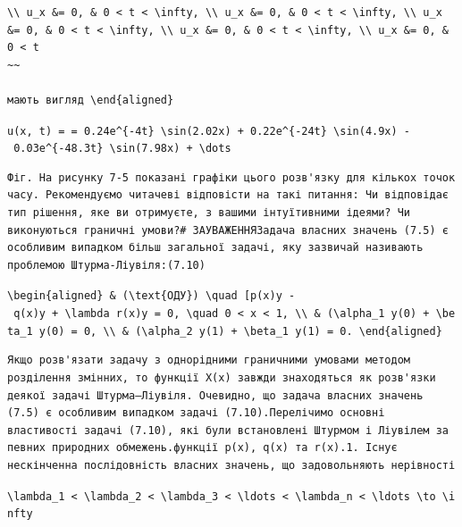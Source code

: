 \documentclass[
  ukrainian,
]{article}
\begin{document}
\begin{verbatim}
\\ u_x &= 0, & 0 < t < \infty, \\ u_x &= 0, & 0 < t < \infty, \\ u_x &= 0, & 0 < t < \infty, \\ u_x &= 0, & 0 < t < \infty, \\ u_x &= 0, & 0 < t
~~

мають вигляд \end{aligned}
\end{verbatim}

\texttt{u(x,\ t)\ =\ =\ 0.24e\^{}\{-4t\}\ \textbackslash{}sin(2.02x)\ +\ 0.22e\^{}\{-24t\}\ \textbackslash{}sin(4.9x)\ -\ 0.03e\^{}\{-48.3t\}\ \textbackslash{}sin(7.98x)\ +\ \textbackslash{}dots}

\begin{verbatim}
Фіг. На рисунку 7-5 показані графіки цього розв'язку для кількох точок часу. Рекомендуємо читачеві відповісти на такі питання: Чи відповідає тип рішення, яке ви отримуєте, з вашими інтуїтивними ідеями? Чи виконуються граничні умови?# ЗАУВАЖЕННЯЗадача власних значень (7.5) є особливим випадком більш загальної задачі, яку зазвичай називають проблемою Штурма-Ліувіля:(7.10)
\end{verbatim}

\texttt{\textbackslash{}begin\{aligned\}\ \&\ (\textbackslash{}text\{ОДУ\})\ \textbackslash{}quad\ {[}p(x)y\textquotesingle{}{]}\textquotesingle{}\ -\ q(x)y\ +\ \textbackslash{}lambda\ r(x)y\ =\ 0,\ \textbackslash{}quad\ 0\ \textless{}\ x\ \textless{}\ 1,\ \textbackslash{}\textbackslash{}\ \&\ (\textbackslash{}alpha\_1\ y(0)\ +\ \textbackslash{}beta\_1\ y\textquotesingle{}(0)\ =\ 0,\ \textbackslash{}\textbackslash{}\ \&\ (\textbackslash{}alpha\_2\ y(1)\ +\ \textbackslash{}beta\_1\ y\textquotesingle{}(1)\ =\ 0.\ \textbackslash{}end\{aligned\}}

\begin{verbatim}
Якщо розв'язати задачу з однорідними граничними умовами методом розділення змінних, то функції X(x) завжди знаходяться як розв'язки деякої задачі Штурма–Ліувіля. Очевидно, що задача власних значень (7.5) є особливим випадком задачі (7.10).Перелічимо основні властивості задачі (7.10), які були встановлені Штурмом і Ліувілем за певних природних обмежень.функції p(x), q(x) та r(x).1. Існує нескінченна послідовність власних значень, що задовольняють нерівності
\end{verbatim}

\texttt{\textbackslash{}lambda\_1\ \textless{}\ \textbackslash{}lambda\_2\ \textless{}\ \textbackslash{}lambda\_3\ \textless{}\ \textbackslash{}ldots\ \textless{}\ \textbackslash{}lambda\_n\ \textless{}\ \textbackslash{}ldots\ \textbackslash{}to\ \textbackslash{}infty}
\end{document}
